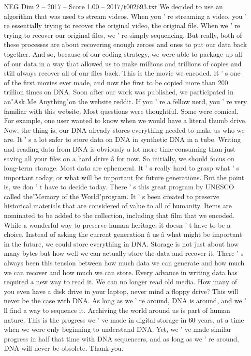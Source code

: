 \begin{textsample}{NEG Dim 2 – 2017 – Score 1.00 – 2017/t002693.txt}
We decided to use an algorithm that was used to stream videos.
When you ' re streaming a video, you ' re essentially trying to recover the original video, the original file.
When we ' re trying to recover our original files, we ' re simply sequencing.
But really, both of these processes are about recovering enough zeroes and ones to put our data back together.
And so, because of our coding strategy, we were able to package up all of our data in a way that allowed us to make millions and trillions of copies and still always recover all of our files back.
This is the movie we encoded.
It ' s one of the first movies ever made, and now the first to be copied more than 200 trillion times on DNA.
Soon after our work was published, we participated in an"Ask Me Anything"on the website reddit.
If you ' re a fellow nerd, you ' re very familiar with this website.
Most questions were thoughtful.
Some were comical.
For example, one user wanted to know when we would have a literal thumb drive.
Now, the thing is, our DNA already stores everything needed to make us who we are.
It ' s a lot safer to store data on DNA in synthetic DNA in a tube.
Writing and reading data from DNA is obviously a lot more time-consuming than just saving all your files on a hard drive â for now.
So initially, we should focus on long-term storage.
Most data are ephemeral.
It ' s really hard to grasp what ' s important today, or what will be important for future generations.
But the point is, we don ' t have to decide today.
There ' s this great program by UNESCO called the"Memory of the World"program.
It ' s been created to preserve historical materials that are considered of value to all of humanity.
Items are nominated to be added to the collection, including that film that we encoded.
While a wonderful way to preserve human heritage, it doesn ' t have to be a choice.
Instead of asking the current generation â us â what might be important in the future, we could store everything in DNA.
Storage is not just about how many bytes but how well we can actually store the data and recover it.
There ' s always been this tension between how much data we can generate and how much we can recover and how much we can store.
Every advance in writing data has required a new way to read it.
We can no longer read old media.
How many of you even have a disk drive in your laptop, never mind a floppy drive?
This will never be the case with DNA.
As long as we ' re around, DNA is around, and we ' ll find a way to sequence it.
Archiving the world around us is part of human nature.
This is the progress we ' ve made in digital storage in 60 years, at a time when we were only beginning to understand DNA.
Yet, we ' ve made similar progress in half that time with DNA sequencers, and as long as we ' re around, DNA will never be obsolete.
Thank you.

\end{textsample}
